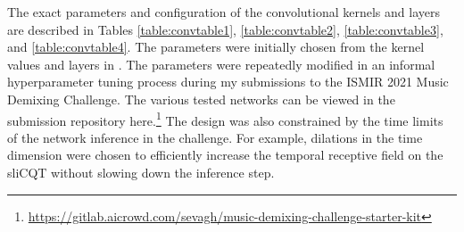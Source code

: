 \documentclass[report.tex]{subfiles}
\begin{document}
The exact parameters and configuration of the convolutional kernels and layers are described in Tables \ref{table:convtable1}, \ref{table:convtable2}, \ref{table:convtable3}, and \ref{table:convtable4}. The parameters were initially chosen from the kernel values and layers in \textcite{plumbley1, plumbley2}. The parameters were repeatedly modified in an informal hyperparameter tuning process during my submissions to the ISMIR 2021 Music Demixing Challenge. The various tested networks can be viewed in the submission repository here.\footnote{\url{https://gitlab.aicrowd.com/sevagh/music-demixing-challenge-starter-kit}} The design was also constrained by the time limits of the network inference in the challenge. For example, dilations in the time dimension were chosen to efficiently increase the temporal receptive field on the sliCQT without slowing down the inference step.
\end{document}
